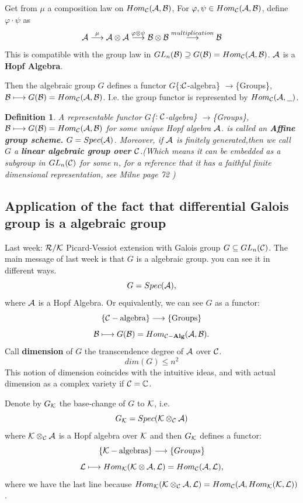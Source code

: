 \documentclass[11pt]{article}
\newtheorem{dfn}[thm]{Definition}
\newcommand{\cplx}{\mathbb C}
\newcommand{\cala}{{\cal A}}
\newcommand{\calb}{{\cal B}}
\newcommand{\calc}{{\cal C}}
\newcommand{\calk}{{\cal K}}
\newcommand{\call}{{\cal L}}
\newcommand{\calr}{{\cal R}}
\newcommand{\mathbold}{\bf}
\newcommand{\alg}{{\mathbold Alg}}
\newcommand{\lrta}{\longrightarrow}
\begin{document}
Get from $\mu$ a composition law on $Hom_\calc(\cala,\calb)$, For $\varphi,\psi\in Hom_\calc(\cala,\calb)$, define $\varphi\cdot\psi$ as 
$$
\cala\overset{\mu}{\lrta}\cala\otimes\cala\overset{\varphi\otimes\psi}{\lrta}\calb\otimes \calb\overset{multiplication}{\lrta}\calb
$$
This is compatible with the group law in $GL_n(\calb)\supseteq G(\calb)=Hom_\calc(\cala,\calb)$. 
$\cala$ is a \textbf{Hopf Algebra}.

Then the algebraic group $G$ defines a functor
$G$\{:$\calc$-algebra\} $\lrta$\{Groups\}, $\calb\longmapsto G(\calb)=Hom_\calc(\cala,\calb)$. I.e. the group functor is represented by $Hom_\calc(\cala,\underline{\ \ })$.

\begin{dfn}
A representable functor $G$\{$:\calc$-algebra\} $\lrta$\{Groups\}, $\calb\longmapsto G(\calb)=Hom_\calc(\cala,\calb)$ for some unique Hopf algebra $\cala$. is called an \textbf{Affine group scheme.} $G=Spec(\cala)$. Moreover, if $\cala$ is finitely generated,then we call $G$ a \textbf{linear algebraic group over $\calc$}.(Which means it can be embedded as a subgroup in $GL_n(\calc)$ for some $n$, for a reference that it has a faithful finite dimensional representation, see Milne page 72 )
\end{dfn}


\subsection{Application of the fact that differential Galois group is a algebraic group}

Last week: $\calr/\calk$ Picard-Vessiot extension with Galois group $G\subseteq GL_n(\calc)$. The main message of last week is that $G$ is a algebraic group. you can see it in different ways.
$$
G=Spec(\cala),
$$
where $\cala$ is a Hopf Algebra. Or equivalently, we can see $G$ as a functor:
$$
\{\calc-\text{algebra}\}\lrta\{\text{Groups}\}
$$
$$
\calb\longmapsto G(\calb)=Hom_{\calc-\alg}(\cala,\calb).
$$
Call \textbf{dimension} of $G$ the transcendence degree of $\cala$ over $\calc$.
$$
dim(G)\leq n^2
$$
This notion of dimension coincides with the intuitive ideas, and with actual dimension as a complex variety if $\calc=\cplx$.

Denote by $G_\calk$ the base-change of $G$ to $\calk$, i.e.
$$
G_\calk=Spec(\calk\otimes_\calc\cala)
$$
where $\calk\otimes_\calc\cala$ is a Hopf algebra over $\calk$ and then $G_\calk$ defines a functor:
$$
\{\calk-\text{algebras}\}\lrta\{Groups\}
$$
$$
\call\longmapsto Hom_\calk(\calk\otimes \cala,\call)=Hom_{\calc}(\cala,\call),
$$
where we have the last line because $Hom_\calk(\calk\otimes_\calc\cala,\call)=Hom_\calc(\cala,Hom_\calk(\calk,\call))$.
\end{document}
